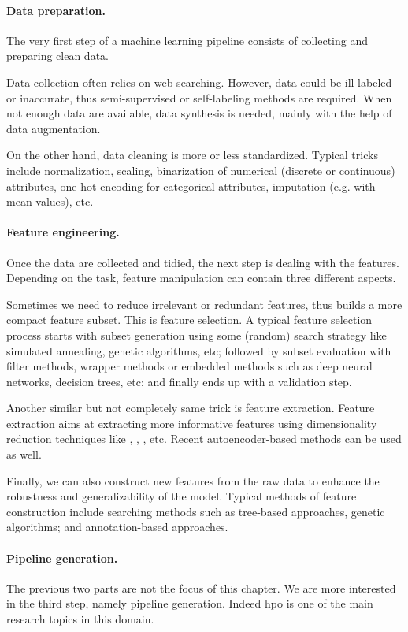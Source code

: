\paragraph{Data preparation.}
The very first step of a machine learning pipeline consists of collecting and preparing clean data.

Data collection often relies on web searching. However, data could be ill-labeled or inaccurate, thus semi-supervised or self-labeling methods are required. When not enough data are available, data synthesis is needed, mainly with the help of data augmentation.

On the other hand, data cleaning is more or less standardized. Typical tricks include normalization, scaling, binarization of numerical (discrete or continuous) attributes, one-hot encoding for categorical attributes, imputation (e.g. with mean values), etc.

\paragraph{Feature engineering.}
Once the data are collected and tidied, the next step is dealing with the features. Depending on the task, feature manipulation can contain three different aspects.

Sometimes we need to reduce irrelevant or redundant features, thus builds a more compact feature subset. This is feature selection. A typical feature selection process starts with subset generation using some (random) search strategy like simulated annealing, genetic algorithms, etc; followed by subset evaluation with filter methods, wrapper methods or embedded methods such as deep neural networks, decision trees, etc; and finally ends up with a validation step.

Another similar but not completely same trick is feature extraction. Feature extraction aims at extracting more informative features using dimensionality reduction techniques like \PCA, \ICA, \LDA, etc. Recent autoencoder-based methods can be used as well.

Finally, we can also construct new features from the raw data to enhance the robustness and generalizability of the model. Typical methods of feature construction include searching methods such as tree-based approaches, genetic algorithms; and annotation-based approaches.

\paragraph{Pipeline generation.} 
The previous two parts are not the focus of this chapter. We are more interested in the third step, namely pipeline generation. Indeed \gls{hpo} is one of the main research topics in this domain.

